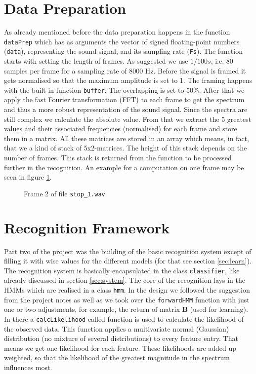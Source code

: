 \documentclass[titlepage]{article}
\begin{document}

\section{Data Preparation}\label{sec:prep}
As already mentioned before the data preparation happens in the function \lstinline&dataPrep& which has as arguments the vector of signed floating-point numbers (\lstinline&data&), representing the sound signal, and its sampling rate (\lstinline&Fs&). The function starts with setting the length of frames. As suggested we use $1/100 s$, i.e. 80 samples per frame for a sampling rate of 8000 Hz. Before the signal is framed it gets normalised so that the maximum amplitude is set to 1. The framing happens with the built-in function \lstinline&buffer&. The overlapping is set to 50\%. After that we apply the fast Fourier transformation (FFT) to each frame to get the spectrum and thus a more robust representation of the sound signal. Since the spectra are still complex we calculate the absolute value. From that we extract the 5 greatest values and their associated frequencies (normalised) for each frame and store them in a matrix. All these matrices are stored in an array which means, in fact, that we a kind of stack of 5x2-matrices. The height of this stack depends on the number of frames. This stack is returned from the function to be processed further in the recognition. An example for a computation on one frame may be seen in figure \ref{fig:frame}.

\begin{figure}[htbp]
	\centering
	\label{fig:frame}
	\caption{Frame 2 of file \lstinline&stop_1.wav&}
\end{figure}

\section{Recognition Framework}\label{sec:hmm}
Part two of the project was the building of the basic recognition system except of filling it with wise values for the different models (for that see section \ref{sec:learn}). The recognition system is basically encapsulated in the class \lstinline&classifier&, like already discussed in section \ref{sec:system}. The core of the recognition lays in the HMMs which are realised in a class \lstinline&hmm&. In the design we followed the suggestion from the project notes as well as we took over the \lstinline&forwardHMM& function with just one or two adjustments, for example, the return of matrix \textbf{B} (used for learning). In there a \lstinline&calcLikelihood& called function is used to calculate the likelihood of the observed data. This function applies a multivariate normal (Gaussian) distribution (no mixture of several distributions) to every feature entry. That means we get one likelihood for each feature. These likelihoods are added up weighted, so that the likelihood of the greatest magnitude in the spectrum influences most.
\end{document}
